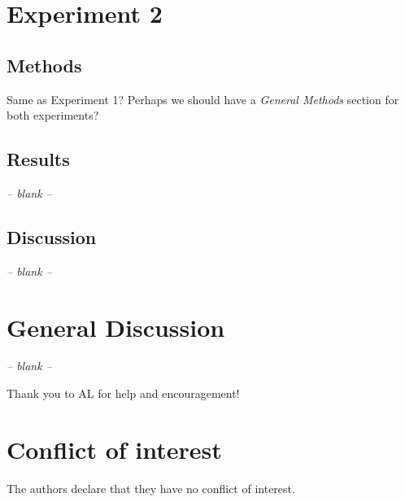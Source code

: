 \documentclass[smallextended]{svjour3}       %
\begin{document}
\section{Experiment 2}

\subsection{Methods}

Same as Experiment 1? Perhaps we should have a \textit{General Methods} section for both experiments?

\subsection{Results}
\begin{center}
\textit{-- blank --}
\end{center}

\subsection{Discussion}
\begin{center}
\textit{-- blank --}
\end{center}

\section{General Discussion}
\begin{center}
\textit{-- blank --}
\end{center}

\begin{acknowledgements}
Thank you to AL for help and encouragement! 
\end{acknowledgements}

%
\section*{Conflict of interest}
The authors declare that they have no conflict of interest.

\end{document}
